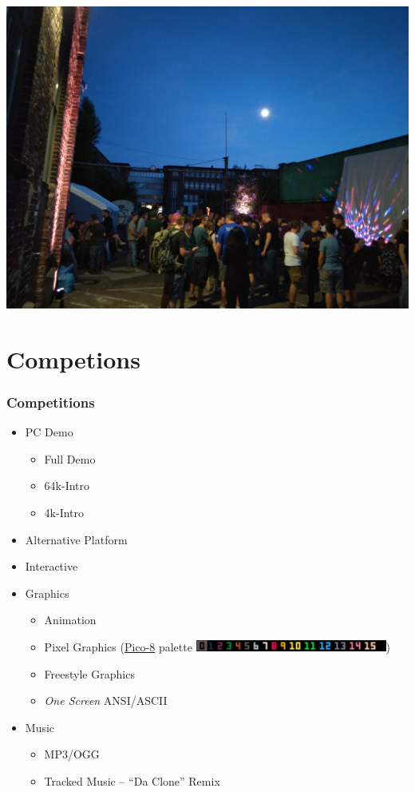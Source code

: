 \documentclass{beamer}
\begin{document}
\begin{frame}
  \includegraphics[width=\textwidth]{IMG_20180818_212407}
\end{frame}


\section{Competions}

\begin{frame}
  \frametitle{Competitions}
  \begin{itemize}
  \item PC Demo
    \begin{itemize}
    \item Full Demo
    \item 64k-Intro
    \item 4k-Intro
    \end{itemize}
  \item Alternative Platform
  \item Interactive
  \item Graphics
    \begin{itemize}
    \item Animation
    \item Pixel Graphics (\href{https://www.lexaloffle.com/pico-8.php}{Pico-8} palette \href{https://www.romanzolotarev.com/pico-8-color-palette/}{\includegraphics[width=17em]{palette}})
    \item Freestyle Graphics
    \item \emph{One Screen} ANSI/ASCII
    \end{itemize}
  \item Music
    \begin{itemize}
    \item MP3/OGG
    \item Tracked Music -- ``Da Clone'' Remix
    \end{itemize}
  \end{itemize}
\end{frame}
\end{document}
